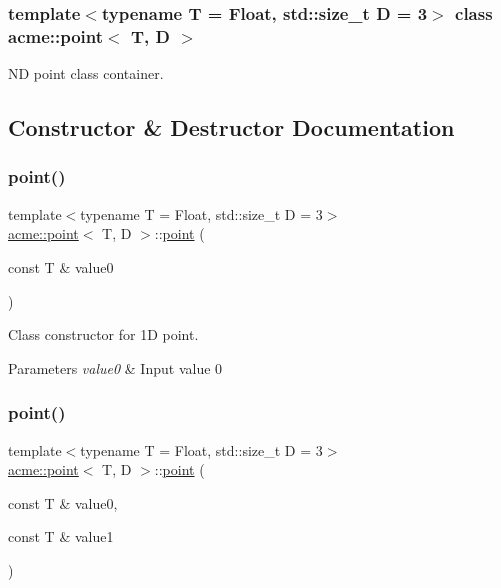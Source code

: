 \subsubsection*{template$<$typename T = Float, std\+::size\+\_\+t D = 3$>$\newline
class acme\+::point$<$ T, D $>$}

ND point class container. 

\subsection{Constructor \& Destructor Documentation}
\mbox{\label{classacme_1_1point_ae1877073e915c45fba6ad5bbefc37f11}} 
\subsubsection{\texorpdfstring{point()}{point()}\hspace{0.1cm}{\footnotesize\ttfamily [1/4]}}
{\footnotesize\ttfamily template$<$typename T = Float, std\+::size\+\_\+t D = 3$>$ \\
\hyperlink{classacme_1_1point}{acme\+::point}$<$ T, D $>$\+::\hyperlink{classacme_1_1point}{point} (\begin{DoxyParamCaption}\item[{const T \&}]{value0 }\end{DoxyParamCaption})\hspace{0.3cm}{\ttfamily [inline]}}



Class constructor for 1D point. 


\begin{DoxyParams}{Parameters}
{\em value0} & Input value 0 \\
\hline
\end{DoxyParams}
\mbox{\label{classacme_1_1point_a83633e83dfae312248d0a01fc9291f2a}} 
\subsubsection{\texorpdfstring{point()}{point()}\hspace{0.1cm}{\footnotesize\ttfamily [2/4]}}
{\footnotesize\ttfamily template$<$typename T = Float, std\+::size\+\_\+t D = 3$>$ \\
\hyperlink{classacme_1_1point}{acme\+::point}$<$ T, D $>$\+::\hyperlink{classacme_1_1point}{point} (\begin{DoxyParamCaption}\item[{const T \&}]{value0,  }\item[{const T \&}]{value1 }\end{DoxyParamCaption})\hspace{0.3cm}{\ttfamily [inline]}}



